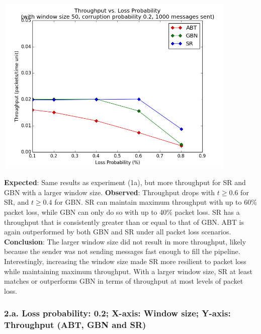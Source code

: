 \documentclass{article}
\begin{document}
\begin{center}
    \includegraphics[width=330pt,height=245pt]{images/exp1g2.png}
\end{center}

\textbf{Expected}: Same results as experiment (1a), but more throughput for SR and GBN with a larger window size.
\newline\newline
\textbf{Observed}: Throughput drops with $t\ge0.6$ for SR, and $t\ge0.4$ for GBN. SR can maintain maximum throughput with up to 60\% packet loss, while GBN can only do so with up to 40\% packet loss. SR has a throughput that is consistently greater than or equal to that of GBN. ABT is again outperformed by both GBN and SR under all packet loss scenarios.
\newline\newline
\textbf{Conclusion}: The larger window size did not result in more throughput, likely because the sender was not sending messages fast enough to fill the pipeline. Interestingly, increasing the window size made SR more resilient to packet loss while maintaining maximum throughput. With a larger window size, SR at least matches or outperforms GBN in terms of throughput at most levels of packet loss.

\pagebreak

\subsubsection{2.a. Loss probability: 0.2; X-axis: Window size; Y-axis: Throughput (ABT, GBN and SR)}
\end{document}
